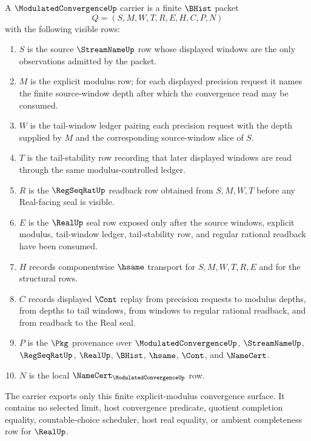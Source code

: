 \begin{definition}
\label{def:modulated-convergence-carrier}
A $\ModulatedConvergenceUp$ carrier is a finite $\BHist$ packet
$$
Q=(S,M,W,T,R,E,H,C,P,N)
$$
with the following visible rows:
\begin{enumerate}
\item $S$ is the source $\StreamNameUp$ row whose displayed windows are the only observations admitted by the packet.
\item $M$ is the explicit modulus row; for each displayed precision request it names the finite source-window depth after which the convergence read may be consumed.
\item $W$ is the tail-window ledger pairing each precision request with the depth supplied by $M$ and the corresponding source-window slice of $S$.
\item $T$ is the tail-stability row recording that later displayed windows are read through the same modulus-controlled ledger.
\item $R$ is the $\RegSeqRatUp$ readback row obtained from $S,M,W,T$ before any Real-facing seal is visible.
\item $E$ is the $\RealUp$ seal row exposed only after the source windows, explicit modulus, tail-window ledger, tail-stability row, and regular rational readback have been consumed.
\item $H$ records componentwise $\hsame$ transport for $S,M,W,T,R,E$ and for the structural rows.
\item $C$ records displayed $\Cont$ replay from precision requests to modulus depths, from depths to tail windows, from windows to regular rational readback, and from readback to the Real seal.
\item $P$ is the $\Pkg$ provenance over $\ModulatedConvergenceUp$, $\StreamNameUp$, $\RegSeqRatUp$, $\RealUp$, $\BHist$, $\hsame$, $\Cont$, and $\NameCert$.
\item $N$ is the local $\NameCert_{\ModulatedConvergenceUp}$ row.
\end{enumerate}
The carrier exports only this finite explicit-modulus convergence surface. It contains no selected limit, host convergence predicate, quotient completion equality, countable-choice scheduler, host real equality, or ambient completeness row for $\RealUp$.
\end{definition}

